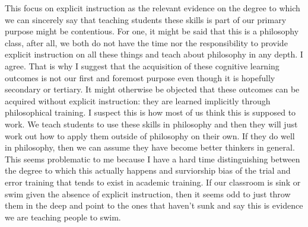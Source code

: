 \documentclass[letterpaper,notitlepage,12pt]{article}
\begin{document}
This focus on explicit instruction as the relevant evidence on the degree to
which we can sincerely say that teaching students these skills is part of our
primary purpose might be contentious.
For one, it might be said that this is a philosophy class, after all, we both do
not have the time nor the responsibility to provide explicit instruction on all
these things and teach about philosophy in any depth.
I agree.
That is why I suggest that the acquisition of these cognitive learning outcomes
is not our first and foremost purpose even though it is hopefully secondary or
tertiary.
It might otherwise be objected that these outcomes can be acquired without
explicit instruction: they are learned implicitly through philosophical
training.
I suspect this is how most of us think this is supposed to work.
We teach students to use these skills in philosophy and then they will just work
out how to apply them outside of philosophy on their own.
If they do well in philosophy, then we can assume they have become better
thinkers in general.
This seems problematic to me because I have a hard time distinguishing between
the degree to which this actually happens and surviorship bias of the trial and
error training that tends to exist in academic training.
If our classroom is sink or swim given the absence of explicit instruction, then
it seems odd to just throw them in the deep and point to the ones that haven't
sunk and say this is evidence we are teaching people to swim.













































\nocite{plato_theaetetus_nodate}

\printbibliography
\end{document}
